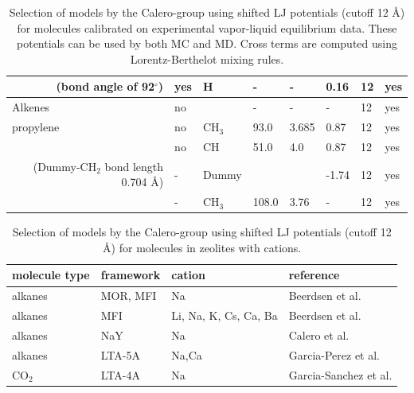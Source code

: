 \begin{table}[H]
\begin{tabular}{p{5.5cm}|p{1.5cm}|p{1.3cm}|p{1.3cm}|p{1.0cm}|p{1.15cm}|p{1.0cm}|p{1.0cm}}
\multicolumn{1}{r|}{(bond angle of 92$^\circ$)}    & yes  & H     & -   & -   &  0.16 & 12 & yes\\
\hline
Alkenes \cite{Liu2008} & no  &       & -   & -   &  -    & 12 & yes\\
\hline
propylene \cite{GutierrezSevillano2010} & no  & CH$_3$  & 93.0 & 3.685 & 0.87 & 12 & yes\\
                   & no  & CH  & 51.0 & 4.0 & 0.87 & 12 & yes\\
\multicolumn{1}{r|}{(Dummy-CH$_2$ bond length 0.704 \AA)} & -   & Dummy &      &     & -1.74 & 12 & yes\\
                   & -   & CH$_3$ & 108.0 & 3.76 & - & 12 & yes\\
\end{tabular}
\caption{Selection of models by the Calero-group using shifted LJ potentials (cutoff 12 \AA)
 for molecules calibrated on experimental vapor-liquid equilibrium data.
 These potentials can be used by both MC and MD.
 Cross terms are computed using Lorentz-Berthelot mixing rules.}
\label{Table: Calero VLE calibrated LJ}
\end{table}
\begin{table}[H]
\begin{tabular}{p{3.5cm}|p{3.5cm}|p{4.0cm}|p{4.0cm}}
molecule type &  framework & cation & reference\\
\hline
\hline
    alkanes     & MOR, MFI & Na     & Beerdsen et al.\cite{Beerdsen2002}\\
    alkanes     & MFI      & Li, Na, K, Cs, Ca, Ba     & Beerdsen et al.\cite{Beerdsen2003}\\
    alkanes     & NaY      & Na  & Calero et al.\cite{Calero2004}\\
    alkanes     & LTA-5A   & Na,Ca  & Garcia-Perez et al.\cite{GarciaPerez2006}\\
    CO$_2$     & LTA-4A   & Na  & Garcia-Sanchez et al.\cite{GarciaSanchez2009}\\
\hline
\end{tabular}
\caption{Selection of models by the Calero-group using shifted LJ potentials (cutoff 12 \AA)
    for molecules in zeolites with cations.}
\label{Table: Calero cations calibrated LJ}
\end{table}

